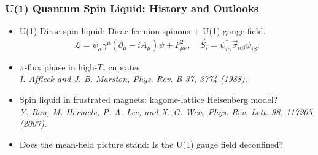 \documentclass[xcolor=table, 10pt, aspectratio=43]{beamer}
\begin{document}
\begin{frame}
  \frametitle{U(1) Quantum Spin Liquid: History and Outlooks}
\begin{itemize}
	\item U(1)-Dirac spin liquid: Dirac-fermion spinons + U(1) gauge field.
	\[\mathcal L = \bar\psi_\alpha \gamma^\mu(\partial_\mu-iA_\mu)\psi +  F_{\mu\nu}^2,\quad
	\vec S_i = \psi^\dagger_{i\alpha}\vec\sigma_{\alpha\beta}\psi_{i\beta}.\]
	\item $\pi$-flux phase in high-$T_c$ cuprates:\\
	\emph{\small I. Affleck and J. B. Marston, Phys. Rev. B 37, 3774 (1988).}
	\item Spin liquid in frustrated magnets: kagome-lattice Heisenberg model?\\
	\emph{\small Y. Ran, M. Hermele, P. A. Lee, and X.-G. Wen, Phys. Rev. Lett. 98, 117205 (2007).}

  \item Does the mean-field picture stand: Is the U(1) gauge field deconfined?
\end{itemize}
\end{frame}

\end{document}
